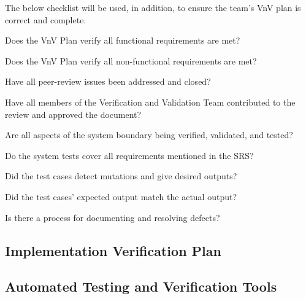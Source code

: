 \documentclass[12pt, titlepage]{article}
\begin{document}
The below checklist will be used, in addition, to ensure the team's VnV plan is correct and complete.

\begin{todolist}
\item Does the VnV Plan verify all functional requirements are met?
\item Does the VnV Plan verify all non-functional requirements are met?
\item Have all peer-review issues been addressed and closed?
\item Have all members of the Verification and Validation Team contributed to the review and approved the document?
\item Are all aspects of the system boundary being verified, validated, and tested?
\item Do the system tests cover all requirements mentioned in the SRS?
\item Did the test cases detect mutations and give desired outputs?
\item Did the test cases' expected output match the actual output?
\item Is there a process for documenting and resolving defects?
\end{todolist}




\subsection{Implementation Verification Plan}




\subsection{Automated Testing and Verification Tools}
\end{document}

